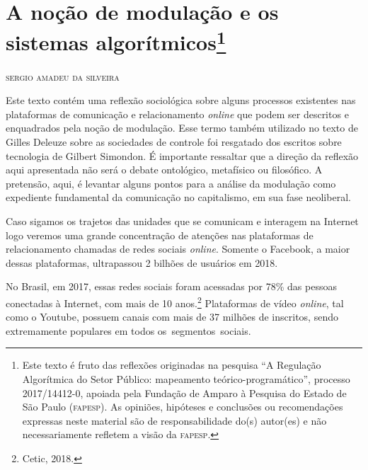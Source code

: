 \chapter{A noção de modulação e os sistemas algorítmicos\footnote{Este texto é fruto das reflexões originadas na pesquisa ``A Regulação Algorítmica do Setor Público: mapeamento teórico-programático'', processo 2017/14412-0, apoiada pela Fundação de Amparo à Pesquisa do Estado de São Paulo (\textsc{fapesp}). As opiniões, hipóteses e conclusões ou recomendações expressas neste material são de responsabilidade do(s) autor(es) e não necessariamente refletem a visão da \textsc{fapesp}.}}

\begin{flushright}
\textsc{sergio amadeu da silveira}
\end{flushright}


\noindent{}Este texto contém uma reflexão sociológica sobre alguns processos
existentes nas plataformas de comunicação e relacionamento \textit{online} que
podem ser descritos e enquadrados pela noção de modulação. Esse termo
também utilizado no texto de Gilles Deleuze sobre as sociedades de
controle foi resgatado dos escritos sobre tecnologia de Gilbert
Simondon. É importante ressaltar que a direção da reflexão aqui
apresentada não será o debate ontológico, metafísico ou filosófico. A
pretensão, aqui, é levantar alguns pontos para a análise da modulação
como expediente fundamental da comunicação no capitalismo, em sua fase
neoliberal.

Caso sigamos os trajetos das unidades que se comunicam e interagem na
Internet logo veremos uma grande concentração de atenções nas
plataformas de relacionamento chamadas de redes sociais \textit{online}. Somente
o Facebook, a maior dessas plataformas, ultrapassou 2 bilhões de
usuários em 2018. 

No Brasil, em 2017, essas redes sociais foram acessadas
por 78\% das pessoas conectadas à Internet, com mais de 10 anos.\footnote{Cetic,
2018.} Plataformas de vídeo \textit{online}, tal como o Youtube, possuem canais
com mais de 37 milhões de inscritos, sendo extremamente populares em
todos os~segmentos~sociais.

